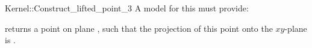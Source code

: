 \begin{ccRefFunctionObjectConcept}{Kernel::Construct_lifted_point_3}
A model for this must provide:


       {returns a point  on plane , such that the projection of
        this point onto the $xy$-plane is .}

\ccIsModel{}

\end{ccRefFunctionObjectConcept}
